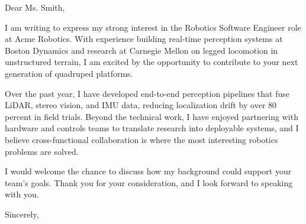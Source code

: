 \documentclass{slate-letter}
\begin{document}



\opening{Dear Ms. Smith,}

I am writing to express my strong interest in the Robotics Software Engineer role at Acme Robotics. With experience building real-time perception systems at Boston Dynamics and research at Carnegie Mellon on legged locomotion in unstructured terrain, I am excited by the opportunity to contribute to your next generation of quadruped platforms.

Over the past year, I have developed end-to-end perception pipelines that fuse LiDAR, stereo vision, and IMU data, reducing localization drift by over 80 percent in field trials. Beyond the technical work, I have enjoyed partnering with hardware and controls teams to translate research into deployable systems, and I believe cross-functional collaboration is where the most interesting robotics problems are solved.

I would welcome the chance to discuss how my background could support your team's goals. Thank you for your consideration, and I look forward to speaking with you.

\closing{Sincerely,}

\signature{John Doe}
\end{document}

